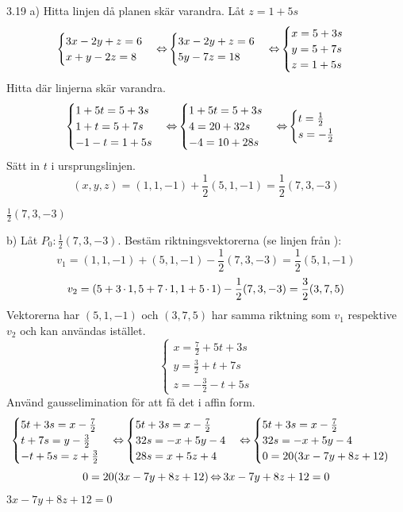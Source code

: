 \begin{task}{3.19 a)}
	Hitta linjen då planen skär varandra. Låt $z=1+5s$
	\[\begin{cases}
		3x-2y+z=6 \\
		x+y-2z=8
	\end{cases} \operatorname{\Leftrightarrow}
	\begin{cases}
		3x-2y+z=6 \\
		5y-7z=18
	\end{cases} \operatorname{\Leftrightarrow}
	\begin{cases}
		x=5+3s \\
		y=5+7s \\
		z=1+5s
	\end{cases}\]
	Hitta där linjerna skär varandra.
	\[\begin{cases}
		1+5t=5+3s \\
		1+t=5+7s \\
		-1-t=1+5s
	\end{cases} \operatorname{\Leftrightarrow}
	\begin{cases}
		1+5t=5+3s \\
		4=20+32s \\
		-4=10+28s
	\end{cases} \operatorname{\Leftrightarrow}
	\begin{cases}
		t=\frac{1}{2} \\
		s=-\frac{1}{2}
	\end{cases}
	\]
	Sätt in $t$ i ursprungslinjen.
	\[(x,y,z)=(1,1,-1)+\frac{1}{2}(5,1,-1)=\frac{1}{2}(7,3,-3)\]

	\ans $\frac{1}{2}(7,3,-3)$
\end{task}

\pagebreak
\begin{task}{b)}
	Låt $P_0:\frac{1}{2}(7,3,-3)$. Bestäm riktningsvektorerna (se linjen från ):
	\[v_1=(1,1,-1)+(5,1,-1)-\frac{1}{2}(7,3,-3)=\frac{1}{2}(5,1,-1)\]
	\[v_2=(5+3\operatorname{\cdot}1,5+7\operatorname{\cdot}1,1+5\operatorname{\cdot}1)-\frac{1}{2}(7,3,-3)=\frac{3}{2}(3,7,5)\]
	Vektorerna har $(5,1,-1)$ och $(3,7,5)$ har samma riktning som $v_1$ respektive $v_2$ och kan användas istället.
	\[\begin{cases}
		x=\frac{7}{2}+5t+3s \\
		y=\frac{3}{2}+t+7s \\
		z=-\frac{3}{2}-t+5s
	\end{cases}\]
	Använd gausselimination för att få det i affin form.
	\[\begin{cases}
		5t+3s=x-\frac{7}{2} \\
		t+7s=y-\frac{3}{2} \\
		-t+5s=z+\frac{3}{2}
	\end{cases} \operatorname{\Leftrightarrow}
	\begin{cases}
		5t+3s=x-\frac{7}{2} \\
		32s=-x+5y-4 \\
		28s=x+5z+4
	\end{cases} \operatorname{\Leftrightarrow}
	\begin{cases}
		5t+3s=x-\frac{7}{2} \\
		32s=-x+5y-4 \\
		0=20(3x-7y+8z+12)
	\end{cases}\]
	\[0=20(3x-7y+8z+12)\operatorname{\Leftrightarrow}
	3x-7y+8z+12=0\]

	\ans $3x-7y+8z+12=0$
\end{task}

